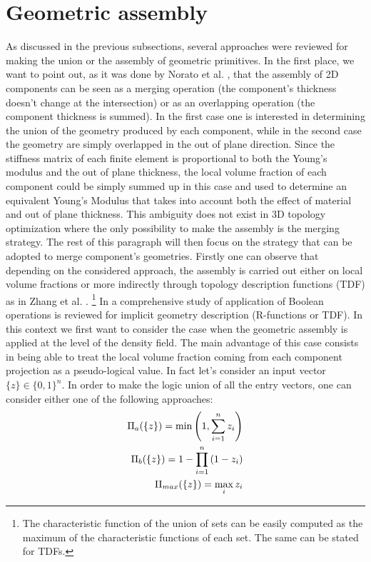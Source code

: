 \section{Geometric assembly}
\label{GA}
As discussed in the previous subsections, several approaches were reviewed for making the union or the assembly of geometric primitives.
In the first place, we want to point out, as it was done by Norato et al. \cite{norato2015geometry}, that the assembly of 2D components can be seen as a merging operation (the component's thickness doesn't change at the intersection) or as an overlapping operation (the component thickness is summed).
In the first case one is interested in determining the union of the geometry produced by each component, while in the second case the geometry are simply overlapped in the out of plane direction. Since the stiffness matrix of each finite element is proportional to both the Young's modulus and the out of plane thickness, the local volume fraction of each component could be simply summed up in this case and used to determine an equivalent Young's Modulus that takes into account both the effect of material and out of plane thickness.
This ambiguity does not exist in 3D topology optimization where the only possibility to make the assembly is the merging strategy. The rest of this paragraph will then focus on the strategy that can be adopted to merge component's geometries.
Firstly one can observe that depending on the considered approach, the assembly is carried out either on local volume fractions or more indirectly through topology description functions (TDF) as in Zhang et al. \cite{zhang2016new}. 
 \footnote{The characteristic function of the union of sets can be easily computed as the maximum of the characteristic functions of each set. The same can be stated for TDFs.}
 In \cite{zhang2017comprehensive} a comprehensive study of application of Boolean operations is reviewed for implicit geometry description (R-functions or TDF).
 In this context we first want to consider the case when the geometric assembly is applied at the level of the density field. The main advantage of this case consists in being able to treat the local volume fraction coming from each component projection as a pseudo-logical value. In fact let's consider an input vector $\lbrace{z}\rbrace \in \{0,1\}^n$. In order to make the logic union of all the entry vectors, one can consider either one of the following approaches:
 \begin{eqnarray}
 \Pi_a(\left\{{z}\right\})=\min\left(1,\sum_{i=1}^n{z_i}\right)\\
 \Pi_b(\left\{{z}\right\})=1-\prod_{i=1}^n{\left(1-z_i\right)}\\
 \Pi_{max}(\left\{{z}\right\})=\max_i{z_i}
 \end{eqnarray}
